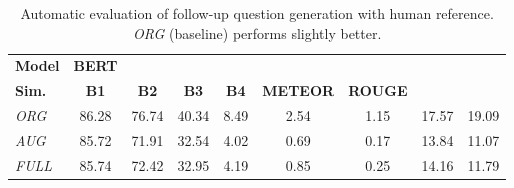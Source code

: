 \begin{table}[!t]
    \centering
    \scriptsize
    \setlength{\tabcolsep}{3pt}  %
    \begin{tabular}{lcccccccc}
        \toprule
        \textbf{Model} & \textbf{BERT} & \shortstack{\textbf{Sent.}\\\textbf{Sim.}} & \textbf{B1}    & \textbf{B2}    & \textbf{B3}    & \textbf{B4}    & \textbf{METEOR} & \textbf{ROUGE}  \\
        \midrule
        \textit{ORG}  & 86.28 & 76.74 & 40.34 & 8.49 & 2.54 & 1.15 & 17.57 & 19.09\\
        \textit{AUG} & 85.72 & 71.91 & 32.54 & 4.02 & 0.69 & 0.17 & 13.84 & 11.07 \\
        \textit{FULL} & 85.74 & 72.42 & 32.95 & 4.19 & 0.85 & 0.25 & 14.16 & 11.79  \\
        \bottomrule
    \end{tabular}
    \caption{Automatic evaluation of follow-up question generation with human reference. \textit{ORG} (baseline) performs slightly better.}
    \label{tab:auto_eval_ref}
\end{table}  